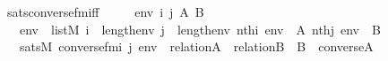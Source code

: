 \begin{isabellebody}
\isanewline
{}\isamarkupfalse%
\ sats{\isacharunderscore}{\kern0pt}converse{\isacharunderscore}{\kern0pt}fm{\isacharunderscore}{\kern0pt}iff\ {\isacharcolon}{\kern0pt}\ \isanewline
\ \ \ env\ i\ j\ A\ B\ \isanewline
\ \ \ {\isachardoublequoteopen}env\ {\isasymin}\ list{\isacharparenleft}{\kern0pt}M{\isacharparenright}{\kern0pt}{\isachardoublequoteclose}\ {\isachardoublequoteopen}i\ {\isacharless}{\kern0pt}\ length{\isacharparenleft}{\kern0pt}env{\isacharparenright}{\kern0pt}{\isachardoublequoteclose}\ {\isachardoublequoteopen}j\ {\isacharless}{\kern0pt}\ length{\isacharparenleft}{\kern0pt}env{\isacharparenright}{\kern0pt}{\isachardoublequoteclose}\ {\isachardoublequoteopen}nth{\isacharparenleft}{\kern0pt}i{\isacharcomma}{\kern0pt}\ env{\isacharparenright}{\kern0pt}\ {\isacharequal}{\kern0pt}\ A{\isachardoublequoteclose}\ {\isachardoublequoteopen}nth{\isacharparenleft}{\kern0pt}j{\isacharcomma}{\kern0pt}\ env{\isacharparenright}{\kern0pt}\ {\isacharequal}{\kern0pt}\ B{\isachardoublequoteclose}\ \isanewline
\ \ \ {\isachardoublequoteopen}sats{\isacharparenleft}{\kern0pt}M{\isacharcomma}{\kern0pt}\ converse{\isacharunderscore}{\kern0pt}fm{\isacharparenleft}{\kern0pt}i{\isacharcomma}{\kern0pt}\ j{\isacharparenright}{\kern0pt}{\isacharcomma}{\kern0pt}\ env{\isacharparenright}{\kern0pt}\ {\isasymlongleftrightarrow}\ relation{\isacharparenleft}{\kern0pt}A{\isacharparenright}{\kern0pt}\ {\isasymand}\ relation{\isacharparenleft}{\kern0pt}B{\isacharparenright}{\kern0pt}\ {\isasymand}\ B\ {\isacharequal}{\kern0pt}\ converse{\isacharparenleft}{\kern0pt}A{\isacharparenright}{\kern0pt}{\isachardoublequoteclose}\ \isanewline
%
\isadelimproof
%
\endisadelimproof
%
\isatagproof
{}\isamarkupfalse%
\ {\isacharminus}{\kern0pt}\ \isanewline
\ \ \isamarkupfalse%

\end{isabellebody}
